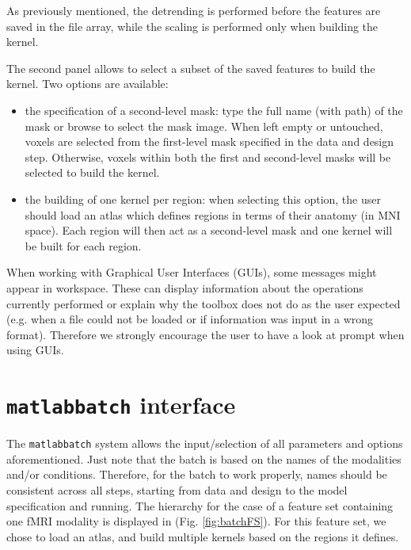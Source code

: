 As previously mentioned, the detrending is performed before the features are saved in the file array, while the scaling is performed only when building the kernel.

The second panel allows to select a subset of the saved features to build the kernel. Two options are available:
\begin{itemize}
\item the specification of a second-level mask: type the full name (with path) of the mask or browse to select the mask image. When left empty or untouched, voxels are selected from the first-level mask specified in the data and design step. Otherwise, voxels within both the first and second-level masks will be selected to build the kernel.
\item the building of one kernel per region: when selecting this option, the user should load an atlas which defines regions in terms of their anatomy (in MNI space). Each region will then act as a second-level mask and one kernel will be built for each region. 
\end{itemize}

When working with Graphical User Interfaces (GUIs), some messages might appear in \matlab workspace. These can display information about the operations currently performed or explain why the toolbox does not do as the user expected (e.g. when a file could not be loaded or if information was input in a wrong format). Therefore we strongly encourage the user to have a look at \matlab prompt when using GUIs.

\section{{\tt matlabbatch} interface}

The {\tt matlabbatch} system allows the input/selection of all parameters and options aforementioned. Just note that the batch is based on the names of the modalities and/or conditions. Therefore, for the batch to work properly, names should be consistent across all steps, starting from data and design to the model specification and running. The hierarchy for the case of a feature set containing one fMRI modality is displayed in (Fig. \ref{fig:batchFS}). For this feature set, we chose to load an atlas, and build multiple kernels based on the regions it defines.

